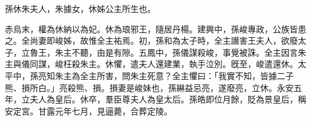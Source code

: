 \begin{pinyinscope}
 
 
 孫休朱夫人，朱據女，休姊公主所生也。
 
 
 赤烏末，權為休納以為妃。休為琅邪王，隨居丹楊。建興中，孫峻專政，公族皆患之。全尚妻即峻姊，故惟全主祐焉。初，孫和為太子時，全主譖害王夫人，欲廢太子，立魯王，朱主不聽，由是有隙。五鳳中，孫儀謀殺峻，事覺被誅。全主因言朱主與儀同謀，峻枉殺朱主。休懼，遣夫人還建業，執手泣別。旣至，峻遣還休。太平中，孫亮知朱主為全主所害，問朱主死意？全主懼曰：「我實不知，皆據二子熊、損所白。」亮殺熊、損。損妻是峻妹也，孫綝益忌亮，遂廢亮，立休。永安五年，立夫人為皇后。休卒，羣臣尊夫人為皇太后。孫皓即位月餘，貶為景皇后，稱安定宮。甘露元年七月，見逼薨，合葬定陵。
 
 
\end{pinyinscope}